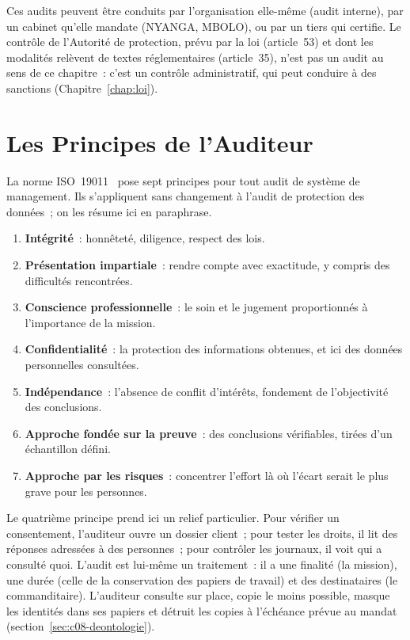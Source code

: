 Ces audits peuvent être conduits par l'organisation elle-même (audit
interne), par un cabinet qu'elle mandate (NYANGA, MBOLO), ou par un tiers qui
certifie. Le contrôle de l'Autorité de protection, prévu par la loi
(article~53) et dont les modalités relèvent de textes réglementaires
(article~35), n'est pas un audit au sens de ce chapitre~: c'est un contrôle
administratif, qui peut conduire à des sanctions (Chapitre~\ref{chap:loi}).

\section{Les Principes de l'Auditeur}
\label{sec:c03-principes}

La norme ISO~19011~\cite{iso19011_2018} pose sept principes pour tout audit
de système de management. Ils s'appliquent sans changement à l'audit de
protection des données~; on les résume ici en paraphrase.

\begin{enumerate}
    \item \textbf{Intégrité}~: honnêteté, diligence, respect des lois.
    \item \textbf{Présentation impartiale}~: rendre compte avec exactitude,
          y compris des difficultés rencontrées.
    \item \textbf{Conscience professionnelle}~: le soin et le jugement
          proportionnés à l'importance de la mission.
    \item \textbf{Confidentialité}~: la protection des informations
          obtenues, et ici des données personnelles consultées.
    \item \textbf{Indépendance}~: l'absence de conflit d'intérêts, fondement
          de l'objectivité des conclusions.
    \item \textbf{Approche fondée sur la preuve}~: des conclusions
          vérifiables, tirées d'un échantillon défini.
    \item \textbf{Approche par les risques}~: concentrer l'effort là où
          l'écart serait le plus grave pour les personnes.
\end{enumerate}

Le quatrième principe prend ici un relief particulier. Pour vérifier un
consentement, l'auditeur ouvre un dossier client~; pour tester les droits,
il lit des réponses adressées à des personnes~; pour contrôler les
journaux, il voit qui a consulté quoi. L'audit est lui-même un traitement~:
il a une finalité (la mission), une durée (celle de la conservation des
papiers de travail) et des destinataires (le commanditaire). L'auditeur
consulte sur place, copie le moins possible, masque les identités dans ses
papiers et détruit les copies à l'échéance prévue au mandat
(section~\ref{sec:c08-deontologie}).

